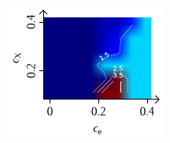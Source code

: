 \documentclass[a4paper, 10pt, twoside, openany]{book} %
\begin{document}
\begin{figure}[b]
\begin{minipage}[t]{0.31\textwidth}
        \label{HKx}
    \end{minipage}
    \hfill
    \begin{minipage}[t]{0.31\textwidth}
        \includegraphics[width=\textwidth]{Abbildungen/Phasendiagramme/Exakt/H_D.pdf}
        \label{HDx}
    \end{minipage}

    \bigskip


\end{figure}
\end{document}
